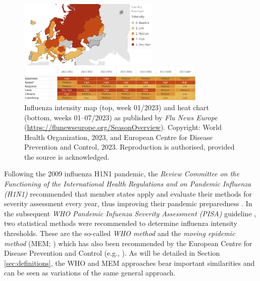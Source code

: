 \documentclass{article}
\begin{document}
\begin{figure}[h!]
\begin{center}
\includegraphics[width=0.6\textwidth]{figure/maps.png}

\medskip

\includegraphics[width=0.8\textwidth]{figure/heat_chart.png}
\end{center}
\caption{Influenza intensity map (top, week 01/2023) and heat chart (bottom, weeks 01--07/2023) as published by \textit{Flu News Europe} (\url{https://flunewseurope.org/SeasonOverview}). Copyright: World Health Organization, 2023, and European Centre for Disease Prevention and Control, 2023.
Reproduction is authorised, provided the source is acknowledged.}
\label{fig:maps}
\end{figure}

Following the 2009 influenza H1N1 pandemic, the \textit{Review Committee on the Functioning of the International Health Regulations and on Pandemic Influenza (H1N1)} recommended that member states apply and evaluate their methods for severity assessment every year, thus improving their pandemic preparedness \citep[p.118]{WHO2011}. In the subsequent \textit{WHO Pandemic Infuenza Severity Assessment (PISA)} guideline \citep{WHO2017}, two statistical methods were recommended to determine influenza intensity thresholds. These are the so-called \textit{WHO method} \citep{WHO2014} and the \textit{moving epidemic method} (MEM; \citealt{Vega2015}) which has also been recommended by the European Centre for Disease Prevention and Control (e.g., \citealt{ECDC2017}). As will be detailed in Section \ref{sec:definitions}, the WHO and MEM approaches bear important similarities and can be seen as variations of the same general approach.
\end{document}
